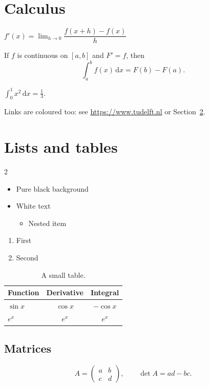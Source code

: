 \section{Calculus}

\begin{definition}[Derivative]
  $f'(x) = \lim_{h \to 0} \dfrac{f(x+h) - f(x)}{h}$
\end{definition}

\begin{theorem}
  If $f$ is continuous on $[a,b]$ and $F' = f$, then
  \[ \int_a^b f(x)\,\mathrm{d}x = F(b) - F(a). \]
\end{theorem}

\begin{example}
  $\displaystyle \int_0^1 x^2\,\mathrm{d}x = \frac{1}{3}$.
\end{example}

\begin{remark}
  Links are coloured too: see \url{https://www.tudelft.nl} or
  Section~\ref{sec:lists}.
\end{remark}

\section{Lists and tables}\label{sec:lists}

\begin{multicols}{2}
\begin{itemize}
  \item Pure black background
  \item White text
  \begin{itemize}
    \item Nested item
  \end{itemize}
\end{itemize}

\begin{enumerate}
  \item First
  \item Second
\end{enumerate}
\end{multicols}

\begin{table}[h]
  \centering
  \begin{tabular}{lcc}
    \toprule
    Function & Derivative & Integral \\
    \midrule
    $\sin x$ & $\cos x$ & $-\cos x$ \\
    $e^x$    & $e^x$    & $e^x$ \\
    \bottomrule
  \end{tabular}
  \caption{A small table.}
\end{table}

\subsection{Matrices}

\[
  A = \begin{pmatrix} a & b \\ c & d \end{pmatrix},
  \qquad \det A = ad - bc.
\]
